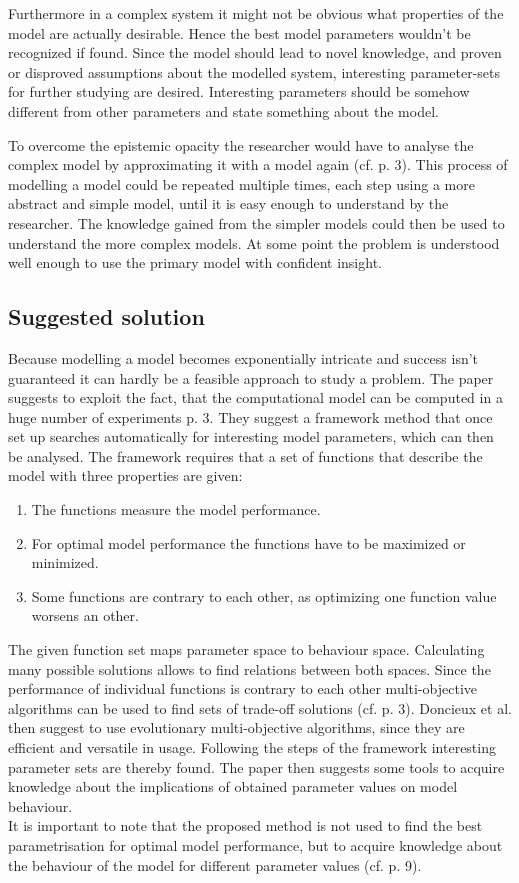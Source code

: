 \documentclass[12pt,twoside]{article}
\theoremstyle{plain}
\theoremstyle{definition}
\theoremstyle{remark}
\begin{document}
Furthermore in a complex system it might not be obvious what properties of the model are actually desirable. Hence the \glqq best\grqq{} model parameters wouldn't be recognized if found.
Since the model should lead to novel knowledge, and proven or disproved assumptions about the modelled system, interesting parameter-sets for further studying are desired. Interesting parameters should be somehow different from other parameters and state something about the model.

To overcome the epistemic opacity the researcher would have to analyse the complex model by approximating it with a model again (cf. \cite{doncieux2015multi} p. 3). This process of modelling a model could be repeated multiple times, each step using a more abstract and simple model, until it is easy enough to understand by the researcher. The knowledge gained from the simpler models could then be used to understand the more complex models. At some point the problem is understood well enough to use the primary model with confident insight.

\subsection{Suggested solution}
Because modelling a model becomes exponentially intricate and success isn't guaranteed it can hardly be a feasible approach to study a problem. The paper suggests to exploit the fact, that the computational model can be computed in a \glqq huge number of experiments\grqq{} \cite{doncieux2015multi} p. 3.
They suggest a framework method that once set up searches automatically for interesting model parameters, which can then be analysed.
The framework requires that a set of functions that describe the model with three properties are given:
\begin{enumerate}
	\item The functions measure the model performance.
	\item For optimal model performance the functions have to be maximized or minimized.
	\item Some functions are contrary to each other, as optimizing one function value worsens an other.
\end{enumerate}
The given function set maps parameter space to behaviour space. Calculating many possible solutions allows to find relations between both spaces.
Since the performance of individual functions is contrary to each other multi-objective algorithms can be used to find sets of trade-off solutions (cf. \cite{doncieux2015multi} p. 3).
Doncieux et al. then suggest to use evolutionary multi-objective algorithms, since they are efficient and versatile in usage. Following the steps of the framework interesting parameter sets are thereby found.
The paper then suggests some tools to acquire knowledge about the implications of obtained parameter values on model behaviour.\\
It is important to note that the proposed method is not used to find the best parametrisation for optimal model performance, but to acquire knowledge about the behaviour of the model for different parameter values (cf. \cite{doncieux2015multi} p. 9).
\end{document}
